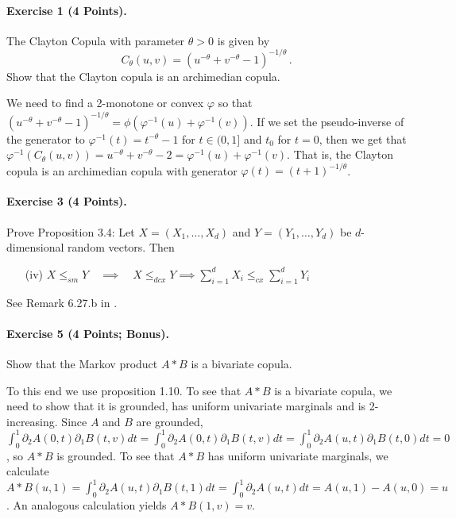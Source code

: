 \documentclass{article}
\begin{document}
\paragraph{Exercise 1 \textnormal{(4 Points)}.}
The Clayton Copula with parameter $\theta>0$ is given by
\[
C_\theta(u,v)=(u^{-\theta}+v^{-\theta}-1)^{-1/\theta}\,.
\]
Show that the Clayton copula is an archimedian copula.

We need to find a 2-monotone or convex $\varphi$ so that $(u^{-\theta}+v^{-\theta}-1)^{-1/\theta}=\phi(\varphi^{-1}(u)+\varphi^{-1}(v))$.
If we set the pseudo-inverse of the generator to $\varphi^{-1}(t)=t^{-\theta}-1$ for $t\in(0,1]$ and $t_0$ for $t=0$, then we get that $\varphi^{-1}(C_\theta(u,v))=u^{-\theta}+v^{-\theta}-2=\varphi^{-1}(u)+\varphi^{-1}(v)$.
That is, the Clayton copula is an archimedian copula with generator $\varphi(t)=(t+1)^{-1/\theta}$.
\pagebreak
\paragraph{Exercise 3 \textnormal{(4 Points)}.}
Prove Proposition 3.4:
Let $X=(X_1,\dots,X_d)$ and $Y=(Y_1,\dots,Y_d)$ be $d$-dimensional random vectors.
Then

\begin{itemize}
\item [(iv)] $X\leq_{sm}Y\quad\implies\quad X\leq_{dcx}Y\implies\sum_{i=1}^dX_i\leq_{cx}\sum_{i=1}^dY_i$
\end{itemize}
See Remark 6.27.b in \cite{ruschendorf2013mathematical}.
\pagebreak
\paragraph{Exercise 5 \textnormal{(4 Points; Bonus)}.} Show that the Markov product $A*B$ is a bivariate copula.

To this end we use proposition 1.10.
To see that $A*B$ is a bivariate copula, we need to show that it is grounded, has uniform univariate marginals and is 2-increasing.
Since $A$ and $B$ are grounded, $\int_0^1\partial_2A(0,t)\partial_1B(t,v)dt=\int_0^1\partial_2A(0,t)\partial_1B(t,v)dt=\int_0^1\partial_2A(u,t)\partial_1B(t,0)dt=0$, so $A*B$ is grounded.
To see that $A*B$ has uniform univariate marginals, we calculate $A*B(u,1)=\int_0^1\partial_2A(u,t)\partial_1B(t,1)dt=\int_0^1\partial_2A(u,t)dt=A(u,1)-A(u,0)=u$.
An analogous calculation yields ${A*B}(1,v)=v$.
\end{document}
